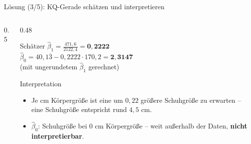 \documentclass[aspectratio=169,11pt]{beamer}
\newcommand{\koerperpunkte}{\addplot[only marks, mark=*, mark size=2.2pt, color=hsbiblue]
  coordinates {(164,39) (162,38) (168,39) (198,46) (166,40) (166,39) (192,45) (160,37) (151,36) (175,42) (180,43) (160,38) (168,41) (175,40) (168,39)};}
\begin{document}
\begin{frame}{Lösung (3/5): KQ-Gerade schätzen und interpretieren}
  \begin{columns}[T]
    \begin{column}{0.5\textwidth}
    \end{column}
    \begin{column}{0.48\textwidth}
      \small
      \begin{block}{Schätzer}
        $\hat{\beta}_1 = \frac{471{,}6}{2122{,}4} = \mathbf{0{,}2222}$\\[3pt]
        $\hat{\beta}_0 = 40{,}1\overline{3} - 0{,}2222 \cdot 170{,}2 = \mathbf{2{,}3147}$\\[2pt]
        \footnotesize (mit ungerundetem $\hat{\beta}_1$ gerechnet)
      \end{block}
      \begin{exampleblock}{Interpretation}
        \begin{itemize}
          \item Je cm Körpergröße ist eine um $0{,}22$ größere Schuhgröße zu
                erwarten -- eine Schuhgröße entspricht rund $4{,}5$ cm.
          \item $\hat{\beta}_0$: Schuhgröße bei $0$ cm Körpergröße --
                weit außerhalb der Daten, \textbf{nicht interpretierbar}.
        \end{itemize}
      \end{exampleblock}
    \end{column}
  \end{columns}
\end{frame}
\end{document}
